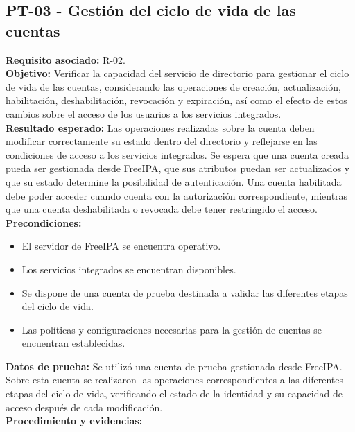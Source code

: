 \subsection{PT-03 - Gestión del ciclo de vida de las cuentas}\label{subsec:pt03}
\textbf{Requisito asociado:} R-02.\\
\textbf{Objetivo:} Verificar la capacidad del servicio de directorio para gestionar el ciclo de vida de las cuentas, considerando las operaciones de creación, actualización, habilitación, deshabilitación, revocación y expiración, así como el efecto de estos cambios sobre el acceso de los usuarios a los servicios integrados.\\
\textbf{Resultado esperado:} Las operaciones realizadas sobre la cuenta deben modificar correctamente su estado dentro del directorio y reflejarse en las condiciones de acceso a los servicios integrados.
Se espera que una cuenta creada pueda ser gestionada desde FreeIPA, que sus atributos puedan ser actualizados y que su estado determine la posibilidad de autenticación. Una cuenta habilitada debe poder acceder cuando cuenta con la autorización correspondiente, mientras que una cuenta deshabilitada o revocada debe tener restringido el acceso.\\
\textbf{Precondiciones:}
\begin{itemize}
	\item El servidor de FreeIPA se encuentra operativo.
	\item Los servicios integrados se encuentran disponibles.
	\item Se dispone de una cuenta de prueba destinada a validar las diferentes etapas del ciclo de vida.
	\item Las políticas y configuraciones necesarias para la gestión de cuentas se encuentran establecidas.
\end{itemize}
\textbf{Datos de prueba:} Se utilizó una cuenta de prueba gestionada desde FreeIPA. Sobre esta cuenta se realizaron las operaciones correspondientes a las diferentes etapas del ciclo de vida, verificando el estado de la identidad y su capacidad de acceso después de cada modificación.\\
\textbf{Procedimiento y evidencias:}
